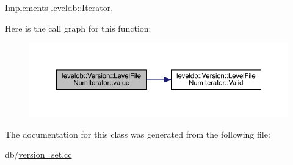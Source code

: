 Implements \mbox{\hyperlink{classleveldb_1_1_iterator_a613ac2e965518aad7a064c64c72bcf7c}{leveldb\+::\+Iterator}}.

Here is the call graph for this function\+:
\nopagebreak
\begin{figure}[H]
\begin{center}
\leavevmode
\includegraphics[width=350pt]{classleveldb_1_1_version_1_1_level_file_num_iterator_af7b7da923a316d8b85f7194c926470db_cgraph}
\end{center}
\end{figure}


The documentation for this class was generated from the following file\+:\begin{DoxyCompactItemize}
\item 
db/\mbox{\hyperlink{version__set_8cc}{version\+\_\+set.\+cc}}\end{DoxyCompactItemize}
